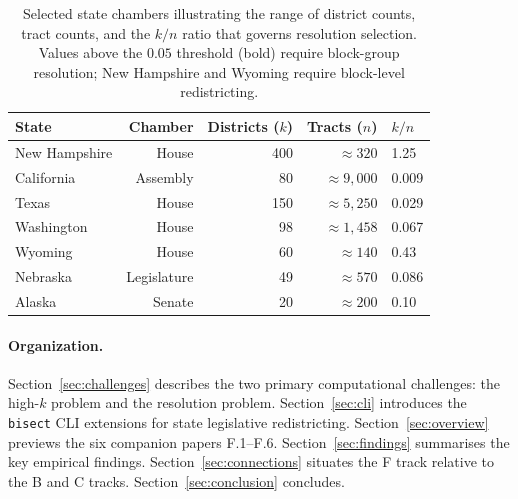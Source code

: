 \begin{table}[h]
\centering\small
\begin{tabular}{lrrrl}
\toprule
State & Chamber & Districts ($k$) & Tracts ($n$) & $k/n$ \\
\midrule
New Hampshire & House   & 400 & $\approx 320$ & 1.25 \\
California    & Assembly & 80  & $\approx 9{,}000$ & 0.009 \\
Texas         & House   & 150 & $\approx 5{,}250$ & 0.029 \\
Washington    & House   & 98  & $\approx 1{,}458$ & 0.067 \\
Wyoming       & House   & 60  & $\approx 140$ & 0.43 \\
Nebraska      & Legislature & 49 & $\approx 570$ & 0.086 \\
Alaska        & Senate  & 20  & $\approx 200$ & 0.10 \\
\bottomrule
\end{tabular}
\caption{Selected state chambers illustrating the range of district counts,
  tract counts, and the $k/n$ ratio that governs resolution selection.
  Values above the $0.05$ threshold (bold) require block-group resolution;
  New Hampshire and Wyoming require block-level redistricting.}
\label{tab:chamber-scale}
\end{table}

\paragraph{Organization.}
Section~\ref{sec:challenges} describes the two primary computational challenges:
the high-$k$ problem and the resolution problem. Section~\ref{sec:cli}
introduces the \texttt{bisect} CLI extensions for state legislative redistricting.
Section~\ref{sec:overview} previews the six companion papers F.1--F.6.
Section~\ref{sec:findings} summarises the key empirical findings.
Section~\ref{sec:connections} situates the F track relative to the B and C tracks.
Section~\ref{sec:conclusion} concludes.
